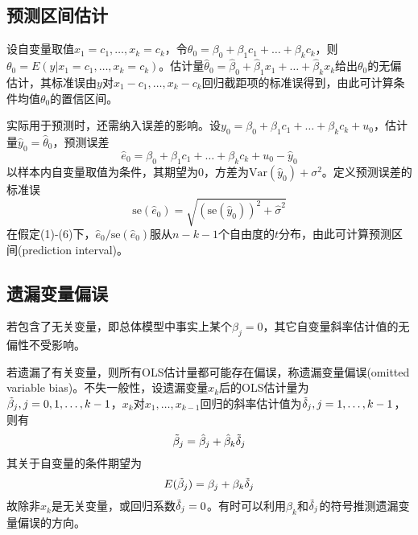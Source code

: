 \subsection{预测区间估计}

\par 设自变量取值$x_1=c_1,\dots,x_k=c_k$，令$\theta_0=\beta_0+\beta_1 c_1+\dots+\beta_k c_k$，则$\theta_0=E(y\vert x_1=c_1,\dots,x_k=c_k)$。估计量$\hat{\theta}_0=\hat{\beta}_0+\hat{\beta}_1 x_1+\dots+\hat{\beta}_k x_k$给出$\theta_0$的无偏估计，其标准误由$y$对$x_1-c_1,\dots,x_k-c_k$回归截距项的标准误得到，由此可计算条件均值$\theta_0$的置信区间。

\par 实际用于预测时，还需纳入误差的影响。设$y_0=\beta_0+\beta_1 c_1+\dots+\beta_k c_k+u_0$，估计量$\hat{y}_0=\hat{\theta}_0$，预测误差
\begin{equation}
    \hat{e}_0=\beta_0+\beta_1 c_1+\dots+\beta_k c_k+u_0-\hat{y}_0
\end{equation}
以样本内自变量取值为条件，其期望为0，方差为$\text{Var}(\hat{y}_0)+\sigma^2$。定义预测误差的标准误
\begin{equation}
    \text{se}(\hat{e}_0)=\sqrt{(\text{se}(\hat{y}_0))^2+\hat{\sigma}^2}
\end{equation}
在假定(1)-(6)下，$\hat{e}_0/\text{se}(\hat{e}_0)$服从$n-k-1$个自由度的$t$分布，由此可计算预测区间(prediction interval)。

\subsection{遗漏变量偏误}

\par 若包含了无关变量，即总体模型中事实上某个$\beta_j=0$，其它自变量斜率估计值的无偏性不受影响。

\par 若遗漏了有关变量，则所有OLS估计量都可能存在偏误，称遗漏变量偏误(omitted variable bias)。不失一般性，设遗漏变量$x_k$后的OLS估计量为$\Tilde{\beta}_j,j=0,1,\dots,k-1$，$x_k$对$x_1,\dots,x_{k-1}$回归的斜率估计值为$\Tilde{\delta}_j,j=1,\dots,k-1$，则有
\begin{equation}
    \Tilde{\beta}_j=\hat{\beta}_j+\hat{\beta}_k\Tilde{\delta}_j
\end{equation}
其关于自变量的条件期望为
\begin{equation}
    E(\Tilde{\beta}_j)=\beta_j+\beta_k\Tilde{\delta}_j
\end{equation}
故除非$x_k$是无关变量，或回归系数$\Tilde{\delta}_j=0$。有时可以利用$\beta_k$和$\Tilde{\delta}_j$的符号推测遗漏变量偏误的方向。

